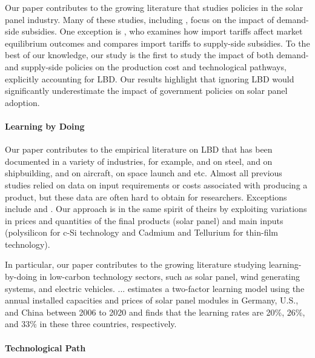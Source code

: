 \documentclass[12pt, letter]{article}
\begin{document}
Our paper contributes to the growing literature that studies policies in the solar panel industry. Many of these studies, including \citet{de2019subsidies}, focus on the impact of demand-side subsidies. One exception is
\citet{bollinger2025strategic}, who examines how import tariffs affect market equilibrium outcomes and compares import tariffs to supply-side subsidies. 
To the best of our knowledge, our study is the first to study the impact of both demand- and supply-side policies on the production cost and technological pathways, explicitly accounting for LBD. Our results highlight that ignoring LBD would significantly underestimate the impact of government policies on solar panel adoption.


\paragraph{Learning by Doing}
Our paper contributes to the empirical literature on LBD that has been documented in a variety of industries, for example, \citet{head1994infant} and \citet{ohashi2005learning} on steel, \citet{thompson2001much} and \citet{thornton2001learning} on shipbuilding, \citet{benkard2000learning} and \citet{benkard2004dynamic} on aircraft, \citet{su2025LBD} on space launch and etc. Almost all previous studies relied on data on input requirements or costs associated with producing a product, but these data are often hard to obtain for researchers. Exceptions include \citet{covert2022winds} and \citet{barwick2025drive}. Our approach is in the same spirit of theirs by exploiting variations in prices and quantities of the final products (solar panel) and main inputs (polysilicon for c-Si technology and Cadmium and Tellurium for thin-film technology).

In particular, our paper contributes to the growing literature studying learning-by-doing in low-carbon technology sectors, such as solar panel, wind generating systems, and electric vehicles. 
\citet{barwick2025drive} ...
\citet{helveston2022quantifying} estimates a two-factor learning model using the annual installed capacities and prices of solar panel modules in Germany, U.S., and China between 2006 to 2020 and finds that the learning rates are 20\%, 26\%, and 33\% in these three countries, respectively.

\paragraph{Technological Path}
\end{document}
